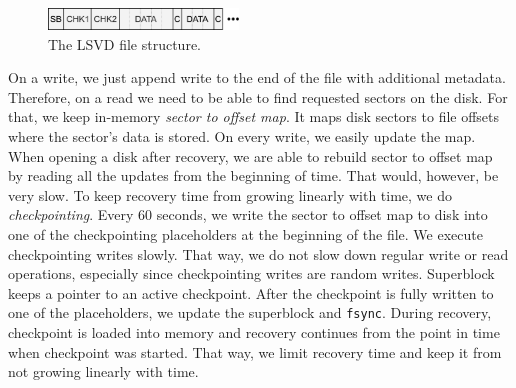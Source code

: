\begin{figure}[h]
    \includegraphics[width=0.45\textwidth]{./figures/lsvd.pdf}
    \caption{The LSVD file structure.}
    \label{fig:lsvd}
\end{figure}


On a write, we just append write to the end of the file with additional metadata. Therefore, on a read we need to be able to find requested sectors on the disk. For that, we keep in-memory \emph{sector to offset map}. It maps disk sectors to file offsets where the sector's data is stored. On every write, we easily update the map. When opening a disk after recovery, we are able to rebuild sector to offset map by reading all the updates from the beginning of time. That would, however, be very slow. To keep recovery time from growing linearly with time, we do \emph{checkpointing}. Every 60 seconds, we write the sector to offset map to disk into one of the checkpointing placeholders at the beginning of the file. We execute checkpointing writes slowly. That way, we do not slow down regular write or read operations, especially since checkpointing writes are random writes. Superblock keeps a pointer to an active checkpoint. After the checkpoint is fully written to one of the placeholders, we update the superblock and \texttt{fsync}. During recovery, checkpoint is loaded into memory and recovery continues from the point in time when checkpoint was started. That way, we limit recovery time and keep it from not growing linearly with time.

